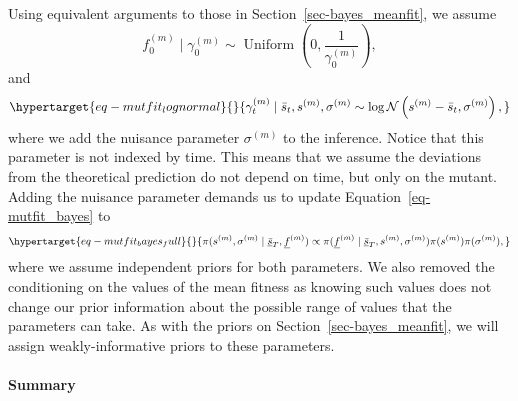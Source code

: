 \documentclass[
]{scrartcl}
\let\oldparagraph\paragraph
\renewcommand{\paragraph}[1]{\oldparagraph{#1}\mbox{}}
\begin{document}
\begin{refsegment}
Using equivalent arguments to those in Section~\ref{sec-bayes_meanfit},
we assume \[
f_0^{(m)} \mid \gamma_0^{(m)} \sim 
\operatorname{Uniform}\left(0, \frac{1}{\gamma_0^{(m)}} \right),
\] and \begin{equation}\protect\hypertarget{eq-mutfit_lognormal}{}{
\gamma_t^{(m)} \mid \bar{s}_t, s^{(m)}, \sigma^{(m)} \sim 
\log\mathcal{N}\left(s^{(m)} - \bar{s}_t, \sigma^{(m)} \right),
}\label{eq-mutfit_lognormal}\end{equation} where we add the nuisance
parameter \(\sigma^{(m)}\) to the inference. Notice that this parameter
is not indexed by time. This means that we assume the deviations from
the theoretical prediction do not depend on time, but only on the
mutant. Adding the nuisance parameter demands us to update
Equation~\ref{eq-mutfit_bayes} to
\begin{equation}\protect\hypertarget{eq-mutfit_bayes_full}{}{
\pi(
    s^{(m)}, \sigma^{(m)} \mid \underline{\bar{s}}_T, \underline{f}^{(m)}
) \propto
\pi(\underline{f}^{(m)} \mid \underline{\bar{s}}_T, s^{(m)}, \sigma^{(m)})
\pi(s^{(m)}) \pi(\sigma^{(m)}),
}\label{eq-mutfit_bayes_full}\end{equation} where we assume independent
priors for both parameters. We also removed the conditioning on the
values of the mean fitness as knowing such values does not change our
prior information about the possible range of values that the parameters
can take. As with the priors on Section~\ref{sec-bayes_meanfit}, we will
assign weakly-informative priors to these parameters.

\hypertarget{summary-2}{%
\paragraph{Summary}\label{summary-2}}


\end{refsegment}
\end{document}
